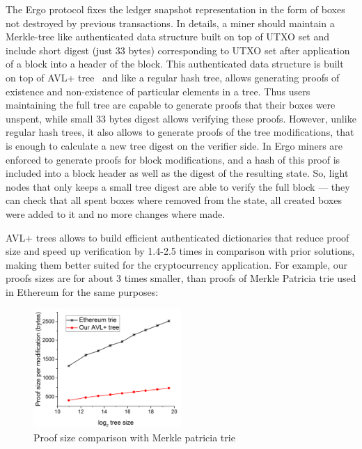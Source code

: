 The Ergo protocol fixes the ledger snapshot representation in the form of boxes not destroyed by previous transactions.
In details, a miner should maintain a Merkle-tree like authenticated data structure built on top of UTXO set and include
short digest (just 33 bytes) corresponding to UTXO set after application of a block into a header of the block.
This authenticated data structure is built on top of AVL+ tree~\cite{reyzin2017improving} and like a regular hash tree,
allows generating proofs of existence and non-existence of particular elements in a tree.
Thus users maintaining the full tree are capable to generate proofs that their boxes were unspent, while small 33 bytes
digest allows verifying these proofs.
However, unlike regular hash trees, it also allows to generate proofs of the tree modifications, that is enough to calculate a new tree digest on the verifier side.
In Ergo miners are enforced to generate proofs for block modifications, and a hash of this proof is included into
a block header as well as the digest of the resulting state.
So, light nodes that only keeps a small tree digest are able to verify the full block --- they can check that all spent boxes where
removed from the state, all created boxes were added to it and no more changes where made.

AVL+ trees allows to build efficient authenticated dictionaries that reduce proof size and speed
up verification by 1.4-2.5 times in comparison with prior solutions, making them better suited for the cryptocurrency application.
For example, our proofs sizes are for about 3 times smaller, than proofs of Merkle Patricia trie used in Ethereum
for the same purposes:


\begin{figure}[H]
    \centering
    \includegraphics[width=0.5\textwidth]{img/proofSize.png}
    \caption{Proof size comparison with Merkle patricia trie
    \label{fig:proofSize} }
\end{figure}

